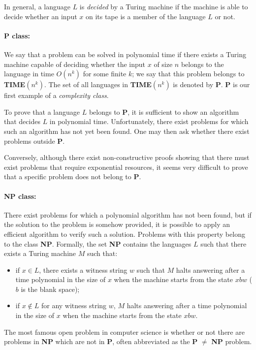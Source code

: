 In general, a language $L$ is \emph{decided} by a Turing machine if the machine is able to decide whether an input $x$ on its tape is a member of the language $L$ or not.

\paragraph{P class:} We say that a problem can be solved in polynomial time if there exists a Turing machine capable of deciding whether the input $x$ of size $n$ belongs to the language in time $O(n^k)$ for some finite $k$; we say that this problem belongs to \textbf{TIME}$(n^k)$. The set of all languages in \textbf{TIME}$(n^k)$ is denoted by \textbf{P}. \textbf{P} is our first example of a \emph{complexity class}.

To prove that a language $L$ belongs to \textbf{P}, it is sufficient to show an algorithm that decides $L$ in polynomial time. Unfortunately, there exist problems for which such an algorithm has not yet been found. One may then ask whether there exist problems outside \textbf{P}.

Conversely, although there exist non-constructive proofs showing that there must exist problems that require exponential resources, it seems very difficult to prove that a specific problem does not belong to \textbf{P}.

\paragraph{NP class:} There exist problems for which a polynomial algorithm has not been found, but if the solution to the problem is somehow provided, it is possible to apply an efficient algorithm to verify such a solution. Problems with this property belong to the class \textbf{NP}. Formally, the set \textbf{NP} contains the languages $L$ such that there exists a Turing machine $M$ such that:
\begin{itemize}
	\item if $x \in L$, there exists a witness string $w$ such that $M$ halts answering  after a time polynomial in the size of $x$ when the machine starts from the state $x b w$ ($b$ is the blank space);
	\item if $x \notin L$ for any witness string $w$, $M$ halts answering  after a time polynomial in the size of $x$ when the machine starts from the state $x b w$.
\end{itemize}
The most famous open problem in computer science is whether or not there are problems in \textbf{NP} which are not in \textbf{P}, often abbreviated as the \textbf{P} $\neq$ \textbf{NP} problem.

